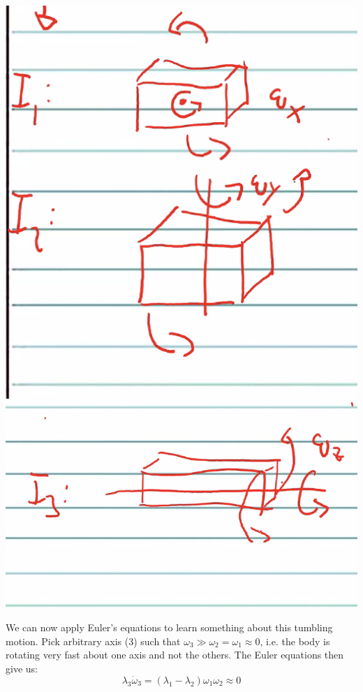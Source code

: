\begin{center}
    \includegraphics[scale=0.7]{Lecture-19/l19-img3.png}
    \includegraphics[scale=0.7]{Lecture-19/l19-img4.png}
\end{center}
We can now apply Euler's equations to learn something about this tumbling motion. Pick arbitrary axis (3) such that $\omega_3 \gg \omega_2 = \omega_1 \approx 0$, i.e. the body is rotating very fast about one axis and not the others. The Euler equations then give us:
\[\lambda_3\dot{\omega}_3 = (\lambda_1 - \lambda_2)\omega_1\omega_2 \approx 0\]
